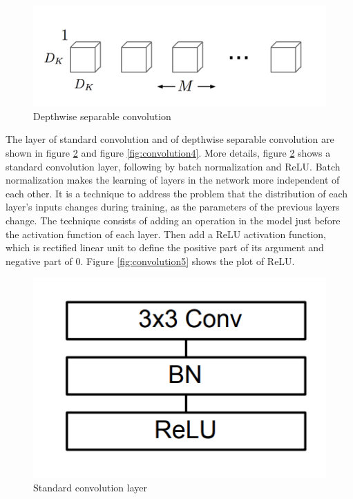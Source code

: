 \documentclass[11pt, titlepage]{article} %
\begin{document}
\begin{figure}[]
	\centering
  	\includegraphics[scale=0.5]{convolution2.png}
   	\caption{Depthwise separable convolution}
   	\label{fig:convolution2}
\end{figure}
The layer of standard convolution and of depthwise separable convolution are shown in figure \ref{fig:convolution3} and figure \ref{fig:convolution4}. More details, figure \ref{fig:convolution3} shows a standard convolution layer, following by batch normalization and ReLU. Batch normalization makes the learning of layers in the network more independent of each other. It is a technique to address the problem that the distribution of each layer’s inputs changes during training, as the parameters of the previous layers change. The technique consists of adding an operation in the model just before the activation function of each layer. Then add a ReLU activation function, which is rectified linear unit to define the positive part of its argument and negative part of 0. Figure \ref{fig:convolution5}  shows the plot of ReLU.

\begin{figure}[]
	\centering
   	\includegraphics[scale=0.5]{convolution3.png}
   	\caption{Standard convolution layer}
   	\label{fig:convolution3}
\end{figure}
\end{document}
